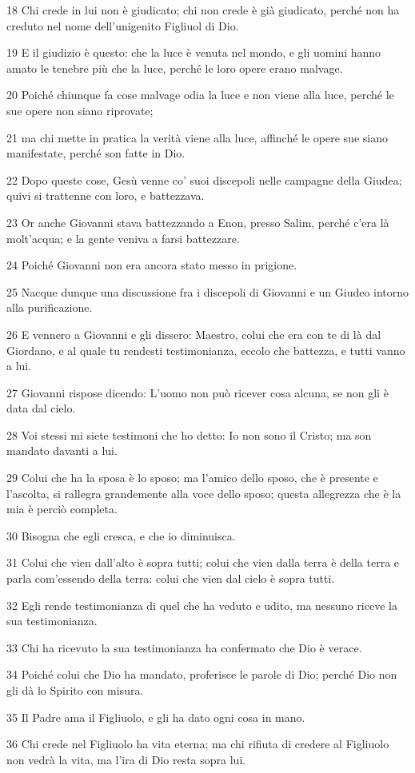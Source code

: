 \par 18 Chi crede in lui non è giudicato; chi non crede è già giudicato, perché non ha creduto nel nome dell'unigenito Figliuol di Dio.
\par 19 E il giudizio è questo: che la luce è venuta nel mondo, e gli uomini hanno amato le tenebre più che la luce, perché le loro opere erano malvage.
\par 20 Poiché chiunque fa cose malvage odia la luce e non viene alla luce, perché le sue opere non siano riprovate;
\par 21 ma chi mette in pratica la verità viene alla luce, affinché le opere sue siano manifestate, perché son fatte in Dio.
\par 22 Dopo queste cose, Gesù venne co' suoi discepoli nelle campagne della Giudea; quivi si trattenne con loro, e battezzava.
\par 23 Or anche Giovanni stava battezzando a Enon, presso Salim, perché c'era là molt'acqua; e la gente veniva a farsi battezzare.
\par 24 Poiché Giovanni non era ancora stato messo in prigione.
\par 25 Nacque dunque una discussione fra i discepoli di Giovanni e un Giudeo intorno alla purificazione.
\par 26 E vennero a Giovanni e gli dissero: Maestro, colui che era con te di là dal Giordano, e al quale tu rendesti testimonianza, eccolo che battezza, e tutti vanno a lui.
\par 27 Giovanni rispose dicendo: L'uomo non può ricever cosa alcuna, se non gli è data dal cielo.
\par 28 Voi stessi mi siete testimoni che ho detto: Io non sono il Cristo; ma son mandato davanti a lui.
\par 29 Colui che ha la sposa è lo sposo; ma l'amico dello sposo, che è presente e l'ascolta, si rallegra grandemente alla voce dello sposo; questa allegrezza che è la mia è perciò completa.
\par 30 Bisogna che egli cresca, e che io diminuisca.
\par 31 Colui che vien dall'alto è sopra tutti; colui che vien dalla terra è della terra e parla com'essendo della terra: colui che vien dal cielo è sopra tutti.
\par 32 Egli rende testimonianza di quel che ha veduto e udito, ma nessuno riceve la sua testimonianza.
\par 33 Chi ha ricevuto la sua testimonianza ha confermato che Dio è verace.
\par 34 Poiché colui che Dio ha mandato, proferisce le parole di Dio; perché Dio non gli dà lo Spirito con misura.
\par 35 Il Padre ama il Figliuolo, e gli ha dato ogni cosa in mano.
\par 36 Chi crede nel Figliuolo ha vita eterna; ma chi rifiuta di credere al Figliuolo non vedrà la vita, ma l'ira di Dio resta sopra lui.


